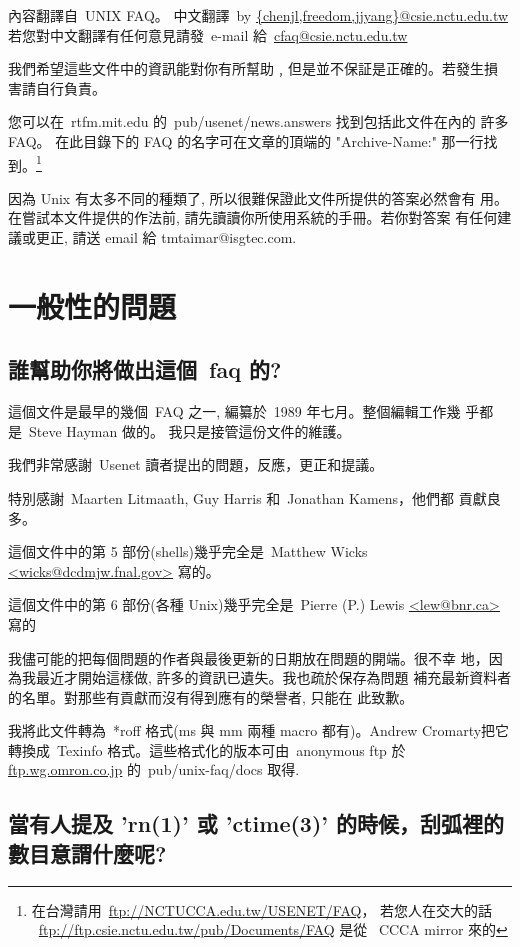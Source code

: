 \documentclass{article}
\begin{document}
\begin{CJK*}{Bg5}{ming} 

內容翻譯自~UNIX FAQ。
中文翻譯~by \url{{chenjl,freedom,jjyang}@csie.nctu.edu.tw}
若您對中文翻譯有任何意見請發~e-mail 給~\url{cfaq@csie.nctu.edu.tw}

我們希望這些文件中的資訊能對你有所幫助﹐但是並不保証是正確的。若發生損
害請自行負責。

您可以在~rtfm.mit.edu 的~pub/usenet/news.answers 找到包括此文件在內的
許多 FAQ。 在此目錄下的 FAQ 的名字可在文章的頂端的 "Archive-Name:" 
那一行找到。\footnote{ 在台灣請用~\url{ftp://NCTUCCA.edu.tw/USENET/FAQ}，
若您人在交大的話 ~\url{ftp://ftp.csie.nctu.edu.tw/pub/Documents/FAQ} 是從
~CCCA mirror  來的}

因為 Unix 有太多不同的種類了, 所以很難保證此文件所提供的答案必然會有
用。在嘗試本文件提供的作法前, 請先讀讀你所使用系統的手冊。若你對答案
有任何建議或更正, 請送 email 給 tmtaimar@isgtec.com.



\section{ 一般性的問題 }
\subsection{ 誰幫助你將做出這個~faq 的? }
	這個文件是最早的幾個~FAQ 之一, 編纂於~1989 年七月。整個編輯工作幾
	乎都是~Steve Hayman 做的。 我只是接管這份文件的維護。

	我們非常感謝~Usenet 讀者提出的問題，反應，更正和提議。

	特別感謝~Maarten Litmaath, Guy Harris 和~Jonathan  Kamens，他們都
	貢獻良多。

	這個文件中的第 5 部份(shells)幾乎完全是~Matthew Wicks 
	\url{<wicks@dcdmjw.fnal.gov>} 寫的。

	這個文件中的第 6 部份(各種 Unix)幾乎完全是~Pierre (P.) Lewis 
	\url{<lew@bnr.ca>}寫的

	我儘可能的把每個問題的作者與最後更新的日期放在問題的開端。很不幸
	地，因為我最近才開始這樣做, 許多的資訊已遺失。我也疏於保存為問題
	補充最新資料者的名單。對那些有貢獻而沒有得到應有的榮譽者, 只能在
        此致歉。

	我將此文件轉為~*roff 格式(ms 與 mm 兩種 macro 都有)。Andrew 
	Cromarty把它轉換成~Texinfo 格式。這些格式化的版本可由~anonymous 
	ftp 於 \url{ftp.wg.omron.co.jp} 的~pub/unix-faq/docs 取得.

\subsection{當有人提及 'rn(1)' 或 'ctime(3)' 的時候，刮弧裡的數目意謂什麼呢?}



\end{CJK*}
\end{document}
